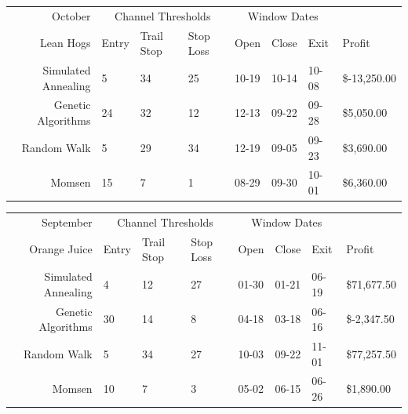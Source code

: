 \documentclass[12pt]{article}
\begin{document}
\begin{tabular}{|r|l|l|l|l|l|l|l|}
  \hline
  October & \multicolumn{3}{|c|}{Channel Thresholds} & \multicolumn{3}{|c|}{Window Dates} &  \\
  Lean Hogs & Entry & Trail Stop & Stop Loss & Open & Close & Exit & Profit\\ \hline
  Simulated Annealing & 5 & 34 & 25 & 10-19 & 10-14 & 10-08 & \$-13,250.00 \\ \hline
  Genetic Algorithms & 24 & 32 & 12 & 12-13 & 09-22 & 09-28 & \$5,050.00 \\ \hline
  Random Walk & 5 & 29 & 34 & 12-19 & 09-05 & 09-23 & \$3,690.00 \\ \hline
  Momsen & 15 & 7 & 1 & 08-29 & 09-30 & 10-01 & \$6,360.00 \\ \hline
\end{tabular}

\begin{tabular}{|r|l|l|l|l|l|l|l|}
  \hline
  September    & \multicolumn{3}{|c|}{Channel Thresholds} & \multicolumn{3}{|c|}{Window Dates} &  \\
  Orange Juice & Entry & Trail Stop & Stop Loss & Open & Close & Exit & Profit\\ \hline
  Simulated Annealing & 4 & 12 & 27 & 01-30 & 01-21 & 06-19 & \$71,677.50 \\ \hline
  Genetic Algorithms & 30 & 14 & 8 & 04-18 & 03-18 & 06-16 & \$-2,347.50 \\ \hline
  Random Walk & 5 & 34 & 27 & 10-03 & 09-22 & 11-01 & \$77,257.50 \\ \hline
  Momsen & 10 & 7 & 3 & 05-02 & 06-15 & 06-26 & \$1,890.00 \\ \hline
\end{tabular}



\nocite{*}
\end{document}
